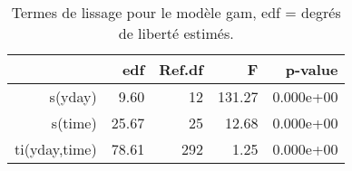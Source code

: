 \begin{table}[!ht]
\centering
\begin{tabular}{rrrrr}
  \hline
 & edf & Ref.df & F & p-value \\ 
  \hline
s(yday) & 9.60 & 12 & 131.27 & 0.000e+00 \\ 
  s(time) & 25.67 & 25 & 12.68 & 0.000e+00 \\ 
  ti(yday,time) & 78.61 & 292 & 1.25 & 0.000e+00 \\ 
   \hline
\end{tabular}
\caption{Termes de lissage pour le modèle gam, edf = degrés de liberté estimés.} 
\label{smpm.st}
\end{table}
